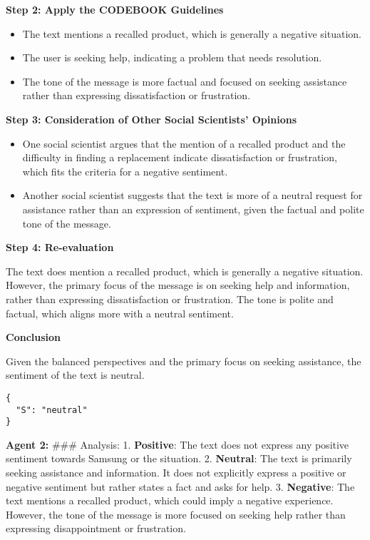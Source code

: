 \textbf{Step 2: Apply the CODEBOOK Guidelines}

\begin{itemize}
\tightlist
\item
  The text mentions a recalled product, which is generally a negative
  situation.
\item
  The user is seeking help, indicating a problem that needs resolution.
\item
  The tone of the message is more factual and focused on seeking
  assistance rather than expressing dissatisfaction or frustration.
\end{itemize}

\textbf{Step 3: Consideration of Other Social Scientists' Opinions}

\begin{itemize}
\tightlist
\item
  One social scientist argues that the mention of a recalled product and
  the difficulty in finding a replacement indicate dissatisfaction or
  frustration, which fits the criteria for a negative sentiment.
\item
  Another social scientist suggests that the text is more of a neutral
  request for assistance rather than an expression of sentiment, given
  the factual and polite tone of the message.
\end{itemize}

\textbf{Step 4: Re-evaluation}

The text does mention a recalled product, which is generally a negative
situation. However, the primary focus of the message is on seeking help
and information, rather than expressing dissatisfaction or frustration.
The tone is polite and factual, which aligns more with a neutral
sentiment.

\textbf{Conclusion}

Given the balanced perspectives and the primary focus on seeking
assistance, the sentiment of the text is neutral.

\begin{verbatim}
{
  "S": "neutral"
}
\end{verbatim}

\textbf{Agent 2:} \#\#\# Analysis: 1. \textbf{Positive}: The text does not
express any positive sentiment towards Samsung or the situation. 2.
\textbf{Neutral}: The text is primarily seeking assistance and
information. It does not explicitly express a positive or negative
sentiment but rather states a fact and asks for help. 3.
\textbf{Negative}: The text mentions a recalled product, which could
imply a negative experience. However, the tone of the message is more
focused on seeking help rather than expressing disappointment or
frustration.

